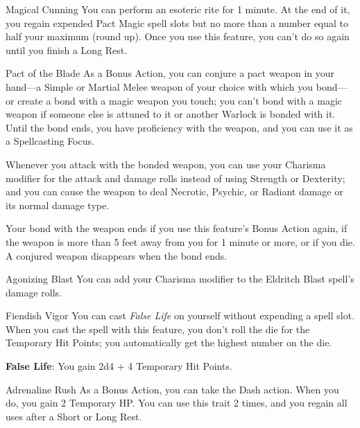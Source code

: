 \newpage


\begin{Card}{Magical Cunning}
You can perform an esoteric rite for 1 minute. At the end of it, you regain expended Pact Magic spell slots but no more than a number equal to half your maximum (round up). Once you use this feature, you can't do so again until you finish a Long Rest.
\end{Card}


\begin{Card}{Pact of the Blade}
As a Bonus Action, you can conjure a pact weapon in your hand—a Simple or Martial Melee weapon of your choice with which you bond—or create a bond with a magic weapon you touch; you can't bond with a magic weapon if someone else is attuned to it or another Warlock is bonded with it. Until the bond ends, you have proficiency with the weapon, and you can use it as a Spellcasting Focus.

Whenever you attack with the bonded weapon, you can use your Charisma modifier for the attack and damage rolls instead of using Strength or Dexterity; and you can cause the weapon to deal Necrotic, Psychic, or Radiant damage or its normal damage type.

Your bond with the weapon ends if you use this feature's Bonus Action again, if the weapon is more than 5 feet away from you for 1 minute or more, or if you die. A conjured weapon disappears when the bond ends.
\end{Card}


\begin{Card}{Agonizing Blast}
You can add your Charisma modifier to the Eldritch Blast spell's damage rolls.
\end{Card}


\begin{Card}{Fiendish Vigor}
You can cast \textit{False Life} on yourself without expending a spell slot. When you cast the spell with this feature, you don't roll the die for the Temporary Hit Points; you automatically get the highest number on the die.

\textbf{False Life}: You gain 2d4 + 4 Temporary Hit Points.
\end{Card}


\begin{Card}{Adrenaline Rush}
As a Bonus Action, you can take the Dash action. When you do, you gain 2 Temporary HP. You can use this trait 2 times, and you regain all uses after a Short or Long Rest.
\end{Card}


